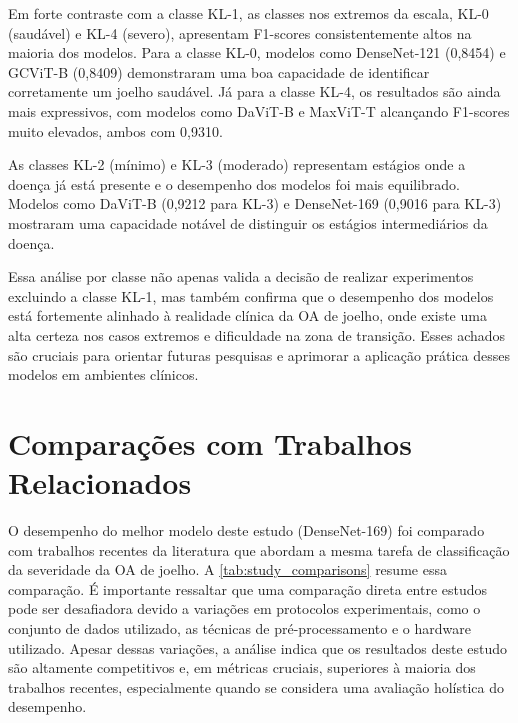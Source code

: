 \begin{table}[!htbp]
\begin{tabular}{|l|c|c|}
    \end{tabular}
\end{table}

Em forte contraste com a classe KL-1, as classes nos extremos da escala, KL-0 (saudável) e KL-4 (severo), apresentam F1-scores consistentemente altos na maioria dos modelos. Para a classe KL-0, modelos como DenseNet-121 (0,8454) e GCViT-B (0,8409) demonstraram uma boa capacidade de identificar corretamente um joelho saudável. Já para a classe KL-4, os resultados são ainda mais expressivos, com modelos como DaViT-B e MaxViT-T alcançando F1-scores muito elevados, ambos com 0,9310.

As classes KL-2 (mínimo) e KL-3 (moderado) representam estágios onde a doença já está presente e o desempenho dos modelos foi mais equilibrado. Modelos como DaViT-B (0,9212 para KL-3) e DenseNet-169 (0,9016 para KL-3) mostraram uma capacidade notável de distinguir os estágios intermediários da doença.

Essa análise por classe não apenas valida a decisão de realizar experimentos excluindo a classe KL-1, mas também confirma que o desempenho dos modelos está fortemente alinhado à realidade clínica da OA de joelho, onde existe uma alta certeza nos casos extremos e dificuldade na zona de transição. Esses achados são cruciais para orientar futuras pesquisas e aprimorar a aplicação prática desses modelos em ambientes clínicos.

\section{Comparações com Trabalhos Relacionados}

O desempenho do melhor modelo deste estudo (DenseNet-169) foi comparado com trabalhos recentes da literatura que abordam a mesma tarefa de classificação da severidade da OA de joelho. A \autoref{tab:study_comparisons} resume essa comparação. É importante ressaltar que uma comparação direta entre estudos pode ser desafiadora devido a variações em protocolos experimentais, como o conjunto de dados utilizado, as técnicas de pré-processamento e o hardware utilizado. Apesar dessas variações, a análise indica que os resultados deste estudo são altamente competitivos e, em métricas cruciais, superiores à maioria dos trabalhos recentes, especialmente quando se considera uma avaliação holística do desempenho.

